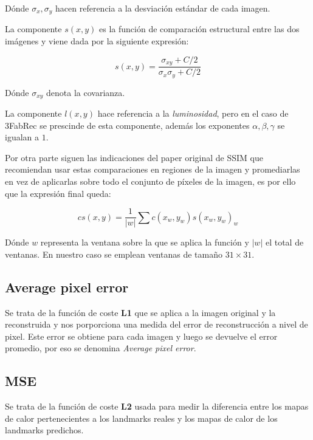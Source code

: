             \noindent Dónde $\sigma_x, \sigma_y$ hacen referencia a la desviación estándar de cada imagen.

            \medskip

            \noindent La componente $s(x,y)$ es la función de comparación estructural entre las dos imágenes y viene dada por la siguiente expresión:

            \begin{equation}
                s(x,y)=\frac{\sigma_{xy}+C/2}{\sigma_x \sigma_y +C/2}
            \end{equation}

            \noindent Dónde $\sigma_{xy}$ denota la covarianza.

            \medskip

            \noindent La componente $l(x,y)$ hace referencia a la \textit{luminosidad}, pero en el caso de 3FabRec se prescinde de esta componente, además los exponentes $\alpha, \beta , \gamma$ se igualan a $1$.

            \medskip

            \noindent Por otra parte siguen las indicaciones del paper original de SSIM que recomiendan usar estas comparaciones en regiones de la imagen y promediarlas en vez de aplicarlas sobre todo el conjunto de píxeles de la imagen, es por ello que la expresión final queda:

            \begin{equation}
                cs(x,y)=\frac{1}{|w|} \sum{c(x_w,y_w)s(x_w,y_w)}_w
            \end{equation}

            \noindent Dónde $w$ representa la ventana sobre la que se aplica la función y $|w|$ el total de ventanas. En nuestro caso se emplean ventanas de tamaño $31\times 31$.

        \subsection{Average pixel error}
            \noindent Se trata de la función de coste \textbf{L1} que se aplica a la imagen original y la reconstruida  y nos porporciona una medida del error de reconstrucción a nivel de pixel. Este error se obtiene para cada imagen y luego se devuelve el error promedio, por eso se denomina \textit{Average pixel error}.

        \subsection{MSE}
            \noindent Se trata de la función de coste \textbf{L2} usada para medir la diferencia entre los mapas de calor pertenecientes a los landmarks reales y los mapas de calor de los landmarks predichos.


\endinput

